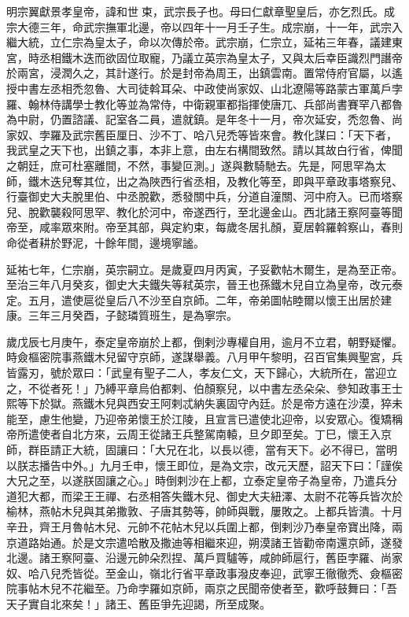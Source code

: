 
\begin{pinyinscope}

 明宗翼獻景孝皇帝，諱和世束，武宗長子也。母曰仁獻章聖皇后，亦乞烈氏。成宗大德三年，命武宗撫軍北邊，帝以四年十一月壬子生。成宗崩，十一年，武宗入繼大統，立仁宗為皇太子，命以次傳於帝。武宗崩，仁宗立，延祐三年春，議建東宮，時丞相鐵木迭而欲固位取寵，乃議立英宗為皇太子，又與太后幸臣識烈門譖帝於兩宮，浸潤久之，其計遂行。於是封帝為周王，出鎮雲南。置常侍府官屬，以遙授中書左丞相禿忽魯、大司徒斡耳朵、中政使尚家奴、山北遼陽等路蒙古軍萬戶孛羅、翰林侍講學士教化等並為常侍，中衛親軍都指揮使唐兀、兵部尚書賽罕八都魯為中尉，仍置諮議、記室各二員，遣就鎮。是年冬十一月，帝次延安，禿忽魯、尚家奴、孛羅及武宗舊臣厘日、沙不丁、哈八兒禿等皆來會。教化謀曰：「天下者，我武皇之天下也，出鎮之事，本非上意，由左右構間致然。請以其故白行省，俾聞之朝廷，庶可杜塞離間，不然，事變叵測。」遂與數騎馳去。先是，阿思罕為太師，鐵木迭兒奪其位，出之為陜西行省丞相，及教化等至，即與平章政事塔察兒、行臺御史大夫脫里伯、中丞脫歡，悉發關中兵，分道自潼關、河中府入。已而塔察兒、脫歡襲殺阿思罕、教化於河中，帝遂西行，至北邊金山。西北諸王察阿臺等聞帝至，咸率眾來附。帝至其部，與定約束，每歲冬居扎顏，夏居斡羅斡察山，春則命從者耕於野泥，十餘年間，邊境寧謐。



 延祐七年，仁宗崩，英宗嗣立。是歲夏四月丙寅，子妥歡帖木爾生，是為至正帝。至治三年八月癸亥，御史大夫鐵失等弒英宗，晉王也孫鐵木兒自立為皇帝，改元泰定。五月，遣使扈從皇后八不沙至自京師。二年，帝弟圖帖睦爾以懷王出居於建康。三年三月癸酉，子懿璘質班生，是為寧宗。



 歲戊辰七月庚午，泰定皇帝崩於上都，倒剌沙專權自用，逾月不立君，朝野疑懼。時僉樞密院事燕鐵木兒留守京師，遂謀舉義。八月甲午黎明，召百官集興聖宮，兵皆露刃，號於眾曰：「武皇有聖子二人，孝友仁文，天下歸心，大統所在，當迎立之，不從者死！」乃縛平章烏伯都剌、伯顏察兒，以中書左丞朵朵、參知政事王士熙等下於獄。燕鐵木兒與西安王阿剌忒納失裏固守內廷。於是帝方遠在沙漠，猝未能至，慮生他變，乃迎帝弟懷王於江陵，且宣言已遣使北迎帝，以安眾心。復矯稱帝所遣使者自北方來，云周王從諸王兵整駕南轅，旦夕即至矣。丁巳，懷王入京師，群臣請正大統，固讓曰：「大兄在北，以長以德，當有天下。必不得已，當明以朕志播告中外。」九月壬申，懷王即位，是為文宗，改元天歷，詔天下曰：「謹俟大兄之至，以遂朕固讓之心。」時倒剌沙在上都，立泰定皇帝子為皇帝，乃遣兵分道犯大都，而梁王王禪、右丞相答失鐵木兒、御史大夫紐澤、太尉不花等兵皆次於榆林，燕帖木兒與其弟撒敦、子唐其勢等，帥師與戰，屢敗之。上都兵皆潰。十月辛丑，齊王月魯帖木兒、元帥不花帖木兒以兵圍上都，倒剌沙乃奉皇帝寶出降，兩京道路始通。於是文宗遣哈散及撒迪等相繼來迎，朔漠諸王皆勸帝南還京師，遂發北邊。諸王察阿臺、沿邊元帥朵烈捏、萬戶買驢等，咸帥師扈行，舊臣孛羅、尚家奴、哈八兒禿皆從。至金山，嶺北行省平章政事潑皮奉迎，武寧王徹徹禿、僉樞密院事帖木兒不花繼至。乃命孛羅如京師，兩京之民聞帝使者至，歡呼鼓舞曰：「吾天子實自北來矣！」諸王、舊臣爭先迎謁，所至成聚。




\end{pinyinscope}
